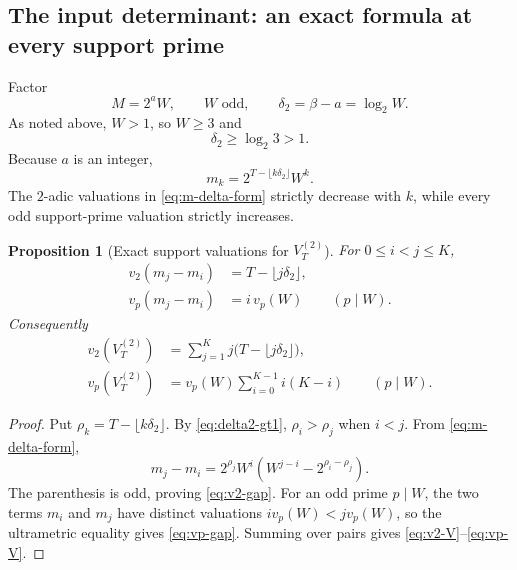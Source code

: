 \documentclass[11pt,oneside]{article}
\newtheorem{proposition}[theorem]{Proposition}
\theoremstyle{definition}
\theoremstyle{remark}
\begin{document}
\subsection{The input determinant: an exact formula at every support prime}

Factor
\[
  M=2^aW,
  \qquad W\text{ odd},
  \qquad
  \delta_2=\beta-a=\log_2W.
\]
As noted above, $W>1$, so $W\ge3$ and
\begin{equation}\label{eq:delta2-gt1}
  \delta_2\ge\log_2 3>1.
\end{equation}
Because $a$ is an integer,
\begin{equation}\label{eq:m-delta-form}
  m_k=2^{T-\lfloor k\delta_2\rfloor}W^k.
\end{equation}
The $2$-adic valuations in \eqref{eq:m-delta-form} strictly decrease with $k$, while every
odd support-prime valuation strictly increases.

\begin{proposition}[Exact support valuations for $V_T^{(2)}$]
\label{prop:input-vander-valuations}
For $0\le i<j\le K$,
\begin{align}
  v_2(m_j-m_i)&=T-\lfloor j\delta_2\rfloor,
  \label{eq:v2-gap}\\
  v_p(m_j-m_i)&=i\,v_p(W)
  \qquad(p\mid W).
  \label{eq:vp-gap}
\end{align}
Consequently
\begin{align}
 v_2(V_T^{(2)})
 &=\sum_{j=1}^Kj\bigl(T-\lfloor j\delta_2\rfloor\bigr),
 \label{eq:v2-V}\\
 v_p(V_T^{(2)})
 &=v_p(W)\sum_{i=0}^{K-1}i(K-i)
 \qquad(p\mid W).
 \label{eq:vp-V}
\end{align}
\end{proposition}

\begin{proof}
Put $\rho_k=T-\lfloor k\delta_2\rfloor$.  By
\eqref{eq:delta2-gt1}, $\rho_i>\rho_j$ when $i<j$.  From
\eqref{eq:m-delta-form},
\[
 m_j-m_i
 =2^{\rho_j}W^i\left(W^{j-i}-2^{\rho_i-\rho_j}\right).
\]
The parenthesis is odd, proving \eqref{eq:v2-gap}.  For an odd prime $p\mid W$, the two terms
$m_i$ and $m_j$ have distinct valuations $i v_p(W)<jv_p(W)$, so the ultrametric equality gives
\eqref{eq:vp-gap}.  Summing over pairs gives \eqref{eq:v2-V}--\eqref{eq:vp-V}.
\end{proof}
\end{document}
